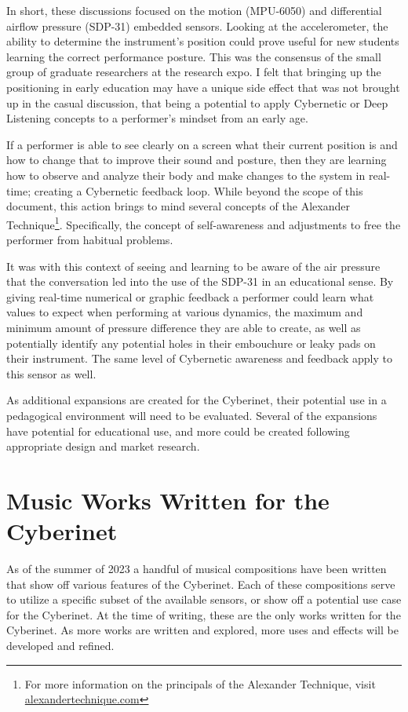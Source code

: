 In short, these discussions focused on the motion (MPU-6050) and differential airflow pressure (SDP-31) embedded sensors. Looking at the accelerometer, the ability to determine the instrument's position could prove useful for new students learning the correct performance posture. This was the consensus of the small group of graduate researchers at the research expo. I felt that bringing up the positioning in early education may have a unique side effect that was not brought up in the casual discussion, that being a potential to apply Cybernetic or Deep Listening concepts to a performer's mindset from an early age.

If a performer is able to see clearly on a screen what their current position is and how to change that to improve their sound and posture, then they are learning how to observe and analyze their body and make changes to the system in real-time; creating a Cybernetic feedback loop\cite{WeinerCybernetics2019}. While beyond the scope of this document, this action brings to mind several concepts of the Alexander Technique\footnote{For more information on the principals of the Alexander Technique, visit \url{alexandertechnique.com}}. Specifically, the concept of self-awareness and adjustments to free the performer from habitual problems\cite{gelbBodyLearning2013}.

It was with this context of seeing and learning to be aware of the air pressure that the conversation led into the use of the SDP-31 in an educational sense. By giving real-time numerical or graphic feedback a performer could learn what values to expect when performing at various dynamics, the maximum and minimum amount of pressure difference they are able to create, as well as potentially identify any potential holes in their embouchure or leaky pads on their instrument. The same level of Cybernetic awareness and feedback apply to this sensor as well.

As additional expansions are created for the Cyberinet, their potential use in a pedagogical environment will need to be evaluated. Several of the expansions have potential for educational use, and more could be created following appropriate design and market research.

\chapter{Music Works Written for the Cyberinet}
As of the summer of 2023 a handful of musical compositions have been written that show off various features of the Cyberinet. Each of these compositions serve to utilize a specific subset of the available sensors, or show off a potential use case for the Cyberinet. At the time of writing, these are the only works written for the Cyberinet. As more works are written and explored, more uses and effects will be developed and refined.

